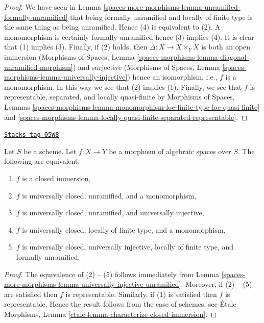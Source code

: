 \begin{proof}
We have seen in
Lemma \ref{spaces-more-morphisms-lemma-unramified-formally-unramified}
that being formally unramified and locally of finite type is the same thing
as being unramified.
Hence (4) is equivalent to (2).
A monomorphism is certainly formally unramified hence (3) implies (4).
It is clear that (1) implies (3). Finally, if (2) holds, then
$\Delta : X \to X \times_Y X$ is both an open immersion
(Morphisms of Spaces, Lemma
\ref{spaces-morphisms-lemma-diagonal-unramified-morphism})
and surjective
(Morphisms of Spaces, Lemma
\ref{spaces-morphisms-lemma-universally-injective})
hence an isomorphism, i.e., $f$ is a monomorphism. In this way we see that
(2) implies (1).
Finally, we see that $f$ is representable, separated, and locally
quasi-finite by
Morphisms of Spaces, Lemmas
\ref{spaces-morphisms-lemma-monomorphism-loc-finite-type-loc-quasi-finite} and
\ref{spaces-morphisms-lemma-locally-quasi-finite-separated-representable}.
\end{proof}

\begin{lemma}
\label{spaces-more-morphisms-lemma-characterize-closed-immersion}
\href{https://stacks.math.columbia.edu/tag/05W8}{\texttt{Stacks tag 05W8}}

Let $S$ be a scheme.
Let $f : X \to Y$ be a morphism of algebraic spaces over $S$.
The following are equivalent:
\begin{enumerate}
\item $f$ is a closed immersion,
\item $f$ is universally closed, unramified, and a monomorphism,
\item $f$ is universally closed, unramified, and universally injective,
\item $f$ is universally closed, locally of finite type, and a monomorphism,
\item $f$ is universally closed, universally injective, locally of
finite type, and formally unramified.
\end{enumerate}
\end{lemma}

\begin{proof}
The equivalence of (2) -- (5) follows immediately from
Lemma \ref{spaces-more-morphisms-lemma-universally-injective-unramified}.
Moreover, if (2) -- (5) are satisfied then $f$ is representable.
Similarly, if (1) is satisfied then $f$ is representable.
Hence the result follows from the case of schemes, see
\'Etale Morphisms, Lemma \ref{etale-lemma-characterize-closed-immersion}.
\end{proof}

